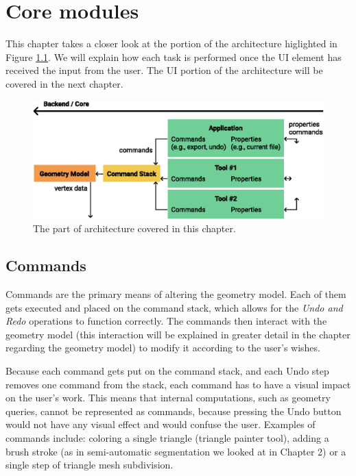 \chapter{Core modules}

This chapter takes a closer look at the portion of the architecture higlighted in Figure \ref{fig:architecture_commandstack}. We will explain how each task is performed once the UI element has received the input from the user. The UI portion of the architecture will be covered in the next chapter.

\begin{figure}[h]
	\centering
	\includegraphics[scale=0.9]{images/architecture_core}
	\caption{The part of architecture covered in this chapter.}
	\label{fig:architecture_commandstack}
\end{figure}


\section{Commands}
Commands are the primary means of altering the geometry model. Each of them gets executed and placed on the command stack, which allows for the \textit{Undo and Redo} operations to function correctly. The commands then interact with the geometry model (this interaction will be explained in greater detail in the chapter regarding the geometry model) to modify it according to the user's wishes.

Because each command gets put on the command stack, and each Undo step removes one command from the stack, each command has to have a visual impact on the user's work. This means that internal computations, such as geometry queries, cannot be represented as commands, because pressing the Undo button would not have any visual effect and would confuse the user. Examples of commands include: coloring a single triangle (triangle painter tool), adding a brush stroke (as in semi-automatic segmentation we looked at in Chapter 2) or a single step of triangle mesh subdivision.


